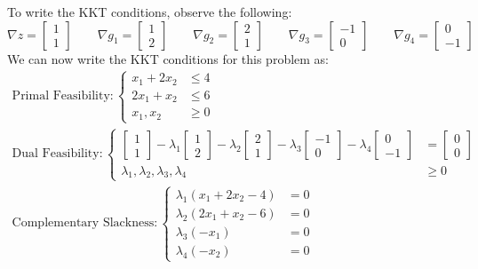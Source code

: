 To write the KKT conditions, observe the following:
\begin{displaymath}
\nabla z = \begin{bmatrix}1\\1\end{bmatrix} \quad \quad \nabla g_1 = \begin{bmatrix}1\\2\end{bmatrix}
\quad\quad \nabla g_2 = \begin{bmatrix}2\\1\end{bmatrix} \quad \quad 
\nabla g_3 = \begin{bmatrix}-1\\0\end{bmatrix} \quad \quad \nabla g_4 = \begin{bmatrix}0\\-1\end{bmatrix}
\end{displaymath}
We can now write the KKT conditions for this problem as:
\begin{gather*}
\text{Primal Feasibility}: \left\{
\begin{aligned}
x_1 + 2x_2 &\leq 4\\
2x_1 + x_2 &\leq 6\\
x_1, x_2 &\geq 0
\end{aligned}
\right.\\
\text{Dual Feasibility}:\left\{
\begin{aligned}
\begin{bmatrix}1\\1\end{bmatrix} - \lambda_1\begin{bmatrix}1\\2\end{bmatrix} - 
\lambda_2\begin{bmatrix}2\\1\end{bmatrix} -\lambda_3\begin{bmatrix}-1\\0\end{bmatrix} - 
\lambda_4\begin{bmatrix}0\\-1\end{bmatrix} &= \begin{bmatrix}0\\0\end{bmatrix}\\
\lambda_1,\lambda_2,\lambda_3,\lambda_4 & \geq 0
\end{aligned}
\right.\\
\text{Complementary Slackness}:\left\{
\begin{aligned}
\lambda_1(x_1 + 2x_2 -4) &= 0\\
\lambda_2(2x_1 + x_2 - 6) &= 0\\
\lambda_3(-x_1) &= 0\\
\lambda_4(-x_2) &= 0
\end{aligned}
\right.
\end{gather*}
